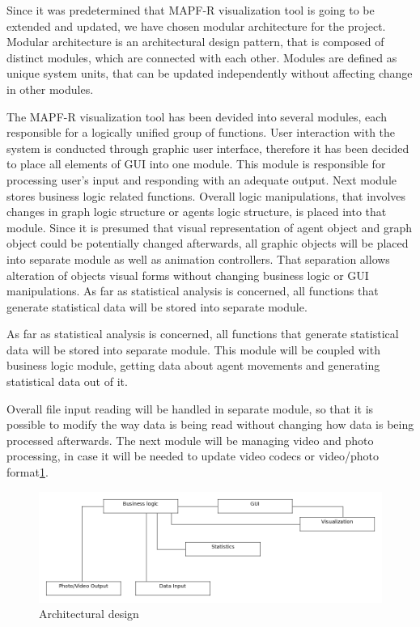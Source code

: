 \documentclass[thesis=B,english]{FITthesis}[2019/12/23]
\begin{document}
Since it was predetermined that MAPF-R visualization tool is going to be extended and updated, we have chosen modular architecture for the project. Modular architecture
is an architectural design pattern, that is composed of distinct modules, which are connected with each other. Modules are defined as unique system units, that can be updated independently without affecting change in other modules. 

The MAPF-R visualization tool has been devided into several modules, each responsible for a logically unified group of functions. User interaction with the system is conducted through graphic user interface, therefore it has been decided to place all elements of GUI into one module. This module is responsible for processing user's input and responding with an adequate output. Next module stores business logic related functions. Overall logic manipulations, that involves changes in graph logic structure or agents logic structure, is placed into that module. Since it is presumed
that visual representation of agent object and graph object could be potentially changed afterwards, all graphic objects will be placed into separate module as well as animation controllers. That separation allows alteration of objects visual forms without changing business logic or GUI manipulations. As far as statistical analysis is concerned, all functions that generate statistical data will be stored into separate module.  

As far as statistical analysis is concerned, all functions that generate statistical data will be stored into separate module. This module will be coupled with business logic module, getting data about agent movements and generating statistical data out of it. 

Overall file input reading will be handled in separate module, so that it is possible to modify the way data is being read without changing how data is being processed afterwards. The next module will be managing video and photo processing, in case it will be needed to update video codecs or video/photo format\ref{fig:float4}. 

\begin{figure}
	\includegraphics[scale=0.4]{Architecture.png}
	\caption[Architecture]{Architectural design}\label{fig:float4}
\end{figure}
\end{document}
